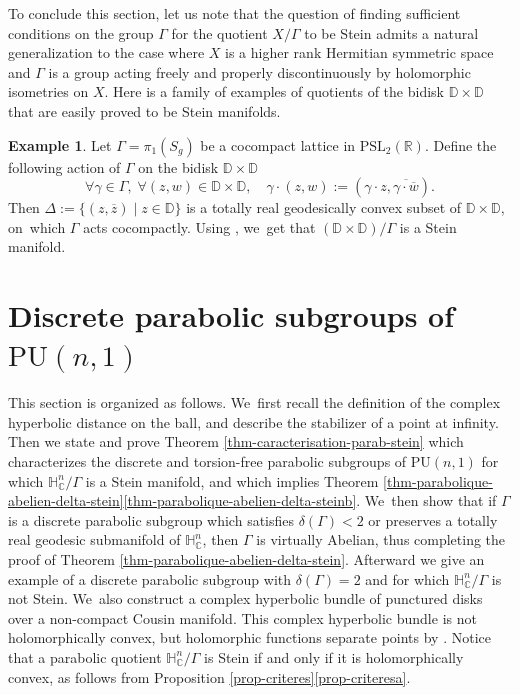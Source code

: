 \documentclass[11pt]{article}
\theoremstyle{definition}
\newtheorem*{example}{Example}
\newcommand{\C}{\mathbb{C}}
\newcommand{\R}{\mathbb{R}}
\newcommand{\HNC}{\mathbb{H}^{n}_{\C}}
\newcommand{\PU}{\mathrm{PU}}
\def\C{\mathbb{C}}
\newcommand{\HNC}{\mathbb{H}^{n}_{\C}}
\newcommand{\PU}{\mathrm{PU}}
\begin{document}
To conclude this section, let us note that the question of finding sufficient conditions on the group $\Gamma$ for the quotient $X/\Gamma$ to be Stein admits a natural generalization to the case where $X$ is a higher rank Hermitian symmetric space and $\Gamma$ is a group acting freely and properly discontinuously by holomorphic isometries on $X$. Here is a family of examples of quotients of the bidisk $\mathbb{D}\times \mathbb{D}$ that are easily proved to be Stein manifolds.

\begin{example}
Let $\Gamma=\pi_1(S_g)$ be a cocompact lattice in $\mathrm{PSL}_2(\R)$. Define the following action of $\Gamma$ on the bidisk $\mathbb{D}\times \mathbb{D}$
\begin{equation*}
\forall \gamma \in \Gamma,\; \forall (z,w)\in \mathbb{D}\times \mathbb{D},\quad \gamma\cdot (z,w):= (\gamma \cdot z,\overline{\gamma \cdot \overline{w}}).
\end{equation*}
Then $\Delta:= \{(z,\overline{z}) \mid z\in \mathbb{D}\}$ is a totally real geodesically convex subset of $\mathbb{D}\times \mathbb{D}$, on~which $\Gamma$ acts cocompactly. Using \cite[Prop.\,3.2]{chenDiscreteGroupsHolomorphic2013}, we~get that $(\mathbb{D}\times \mathbb{D})/\Gamma$ is a Stein manifold.
\end{example}

\section{Discrete parabolic subgroups of \texorpdfstring{$\PU(n,1)$}{PU}}\label{section-paraboliques}

This section is organized as follows. We~first recall the definition of the complex hyperbolic distance on the ball, and describe the stabilizer of a point at infinity. Then we state and prove Theorem \ref{thm-caracterisation-parab-stein} which characterizes the discrete and torsion-free parabolic subgroups of $\PU(n,1)$ for which $\HNC/\Gamma$ is a Stein manifold, and which implies Theorem \ref{thm-parabolique-abelien-delta-stein}\eqref{thm-parabolique-abelien-delta-steinb}. We~then show that if $\Gamma$ is a discrete parabolic subgroup which satisfies $\delta(\Gamma)<2$ or preserves a totally real geodesic submanifold of $\HNC$, then $\Gamma$ is virtually Abelian, thus completing the proof of Theorem \ref{thm-parabolique-abelien-delta-stein}. Afterward we give an example of a discrete parabolic subgroup with $\delta(\Gamma)=2$ and for which $\HNC/\Gamma$ is not Stein. We~also construct a complex hyperbolic bundle of punctured disks over a non-compact Cousin manifold. This complex hyperbolic bundle is not holomorphically convex, but holomorphic functions separate points by \cite[Th.\,1.1]{miebachQuotientsBoundedHomogeneous2024}. Notice that a parabolic quotient $\HNC/\Gamma$ is Stein if and only if it is holomorphically convex, as follows from Proposition \ref{prop-criteres}\eqref{prop-criteresa}.
\end{document}
